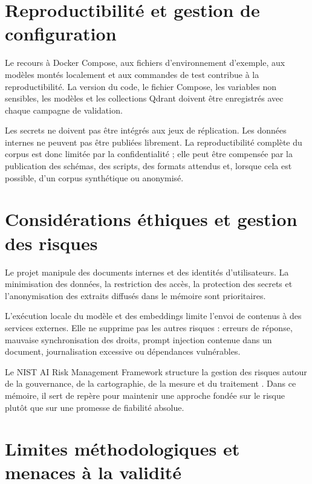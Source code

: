 \section{Reproductibilité et gestion de configuration}

Le recours à Docker Compose, aux fichiers d'environnement d'exemple, aux modèles montés localement et aux commandes de test contribue à la reproductibilité. La version du code, le fichier Compose, les variables non sensibles, les modèles et les collections Qdrant doivent être enregistrés avec chaque campagne de validation.

Les secrets ne doivent pas être intégrés aux jeux de réplication. Les données internes ne peuvent pas être publiées librement. La reproductibilité complète du corpus est donc limitée par la confidentialité ; elle peut être compensée par la publication des schémas, des scripts, des formats attendus et, lorsque cela est possible, d'un corpus synthétique ou anonymisé.

\section{Considérations éthiques et gestion des risques}

Le projet manipule des documents internes et des identités d'utilisateurs. La minimisation des données, la restriction des accès, la protection des secrets et l'anonymisation des extraits diffusés dans le mémoire sont prioritaires.

L'exécution locale du modèle et des embeddings limite l'envoi de contenus à des services externes. Elle ne supprime pas les autres risques : erreurs de réponse, mauvaise synchronisation des droits, prompt injection contenue dans un document, journalisation excessive ou dépendances vulnérables.

Le NIST AI Risk Management Framework structure la gestion des risques autour de la gouvernance, de la cartographie, de la mesure et du traitement \citep{NISTAIRMF2023}. Dans ce mémoire, il sert de repère pour maintenir une approche fondée sur le risque plutôt que sur une promesse de fiabilité absolue.

\section{Limites méthodologiques et menaces à la validité}

